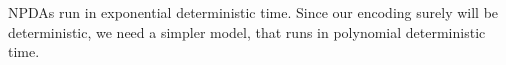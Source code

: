 NPDAs run in exponential deterministic time.
%
%
%
%
%
%
Since our encoding surely will be deterministic, we need a simpler
  model, that runs in polynomial deterministic time.

